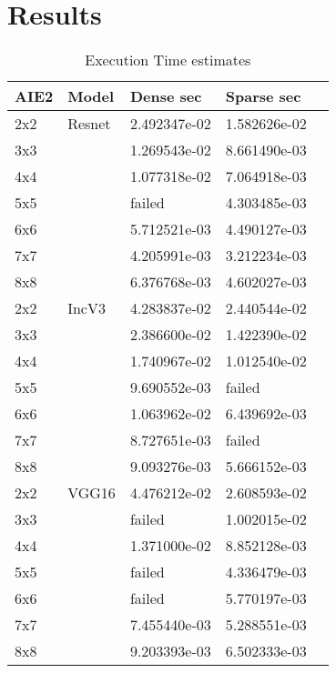 \documentclass[sigconf]{acmart}
\begin{document}
\section{Results}
\label{sec:experiments}
\begin{table}[htb]
  \caption{Execution Time estimates}
  \label{tab_perf}
\begin{center} 
\begin{tabular}{|l|l|l|l|l|}
  \hline
  AIE2 & Model  & Dense sec      & Sparse sec      \\ \hline\hline
  2x2   & Resnet & 2.492347e-02  & 1.582626e-02 \\ \hline
  3x3   &  & 1.269543e-02  & 8.661490e-03 \\ \hline
  4x4   &  &  1.077318e-02 & 7.064918e-03 \\ \hline
  5x5   &  &  failed       & 4.303485e-03 \\ \hline
  6x6   &  &  5.712521e-03 & 4.490127e-03 \\ \hline
  7x7   &  &  4.205991e-03 & 3.212234e-03 \\ \hline
  8x8   &  &  6.376768e-03 & 4.602027e-03 \\ \hline \hline
  2x2   & IncV3  & 4.283837e-02  & 2.440544e-02 \\ \hline
  3x3   &   & 2.386600e-02  & 1.422390e-02 \\ \hline
  4x4   &   &  1.740967e-02 & 1.012540e-02 \\ \hline
  5x5   &   &  9.690552e-03 & failed       \\ \hline
  6x6   &   &  1.063962e-02 & 6.439692e-03 \\ \hline
  7x7   &   &  8.727651e-03 & failed       \\ \hline
  8x8   &   &  9.093276e-03 & 5.666152e-03 \\ \hline \hline
  2x2   & VGG16  & 4.476212e-02  & 2.608593e-02 \\ \hline
  3x3   &   & failed        & 1.002015e-02 \\ \hline
  4x4   &   &  1.371000e-02 & 8.852128e-03 \\ \hline
  5x5   &   &  failed       & 4.336479e-03 \\ \hline
  6x6   &   &  failed       & 5.770197e-03 \\ \hline
  7x7   &   &  7.455440e-03 & 5.288551e-03 \\ \hline
  8x8   &   &  9.203393e-03 & 6.502333e-03 \\ \hline \hline
          
\end{tabular}
\end{center}
\end{table}
\end{document}
